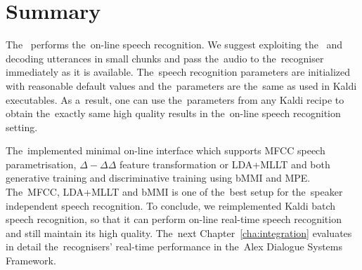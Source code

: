 \section{Summary}
\label{sec:dec_sum}
The~ performs the~on-line speech recognition.
We suggest exploiting the~ and decoding utterances in small chunks and pass the~audio to the~recogniser immediately as it is available.
The~speech recognition parameters are initialized with reasonable default values and the~parameters are the~same as used in Kaldi executables. 
As a~result, one can use the~parameters from any Kaldi recipe to obtain the~exactly same high quality results in the~on-line speech recognition setting.

The~implemented minimal on-line interface which supports \ac{MFCC} speech parametrisation, $\Delta-\Delta\Delta$ feature transformation or \ac{LDA}+\ac{MLLT} and both generative training and discriminative training using \ac{bMMI} and \ac{MPE}.
The~\ac{MFCC}, \ac{LDA}+\ac{MLLT} and \ac{bMMI} is one of the~best setup for the~speaker independent speech recognition.
To conclude, we reimplemented Kaldi batch speech recognition, so that it can perform on-line real-time speech recognition and still maintain its high quality.
The~next Chapter~\ref{cha:integration} evaluates in detail the~recognisers' real-time performance in the~Alex Dialogue Systems Framework.
